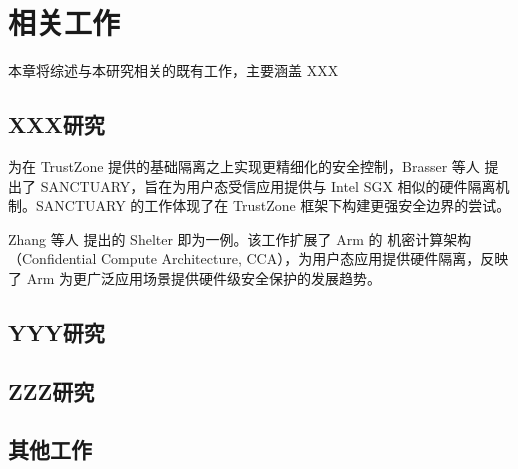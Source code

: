 \chapter{相关工作}\label{Related work}

本章将综述与本研究相关的既有工作，主要涵盖 XXX

\section{XXX研究}
为在 TrustZone 提供的基础隔离之上实现更精细化的安全控制，Brasser 等人\cite{brasser_sanctuary_2019} 提出了 SANCTUARY，旨在为用户态受信应用提供与 Intel SGX 相似的硬件隔离机制。SANCTUARY 的工作体现了在 TrustZone 框架下构建更强安全边界的尝试。

Zhang 等人\cite{zhang_shelter} 提出的 Shelter 即为一例。该工作扩展了 Arm 的 机密计算架构（Confidential Compute Architecture, CCA），为用户态应用提供硬件隔离，反映了 Arm 为更广泛应用场景提供硬件级安全保护的发展趋势。

\section{YYY研究}

\section{ZZZ研究}

\section{其他工作}
